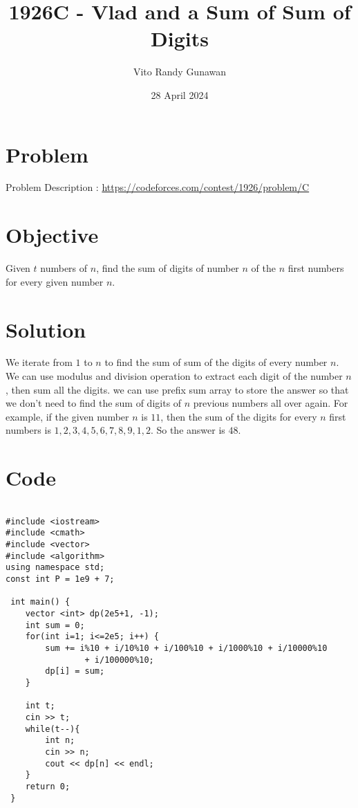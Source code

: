 \documentclass{article}
\title{1926C - Vlad and a Sum of Sum of Digits}
\author{Vito Randy Gunawan}
\date{28 April 2024}
\begin{document}
\maketitle


\section{Problem}

Problem Description : \href{https://codeforces.com/contest/1926/problem/C}{https://codeforces.com/contest/1926/problem/C}

\section{Objective}

Given $t$ numbers of $n$, find the sum of digits of number $n$ of the $n$ first numbers for every given number $n$.

\section{Solution}

We iterate from $1$ to $n$ to find the sum of sum of the digits of every number $n$. We can use modulus and division operation to extract each digit of the number $n$, then sum all the digits. we can use prefix sum array to store the answer so that we don't need to find the sum of digits of $n$ previous numbers all over again. For example, if the given number $n$ is $11$, then the sum of the digits for every $n$ first numbers is $1, 2, 3, 4, 5, 6, 7, 8, 9, 1, 2$. So the answer is $48$.

\newpage
\section{Code}


\begin{lstlisting}

#include <iostream>
#include <cmath>
#include <vector>
#include <algorithm>
using namespace std;
const int P = 1e9 + 7;
 
 int main() {
 	vector <int> dp(2e5+1, -1);
 	int sum = 0;
	for(int i=1; i<=2e5; i++) {
		sum += i%10 + i/10%10 + i/100%10 + i/1000%10 + i/10000%10
                + i/100000%10;
		dp[i] = sum;
	}
 
	int t;
 	cin >> t;
 	while(t--){
 		int n;
 		cin >> n;
 		cout << dp[n] << endl;
 	}
 	return 0;
 }
 
\end{lstlisting}
\end{document}
